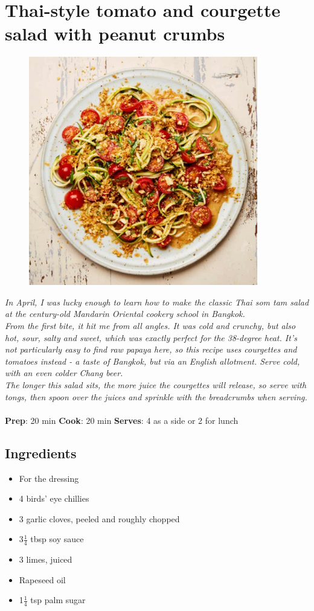 \documentclass{book}
\begin{document}
\section{Thai-style tomato and courgette salad with peanut crumbs}
\begin{figure}
\centering\includegraphics[width=10cm,height=10cm,keepaspectratio]{Recipe_Pictures/Thai-style_tomato_and_courgette_salad_with_peanut_crumbs.png}
\end{figure}
\emph{In April, I was lucky enough to learn how to make the classic Thai som tam salad at the century-old Mandarin Oriental cookery school in Bangkok. \\ 
From the first bite, it hit me from all angles. It was cold and crunchy, but also hot, sour, salty and sweet, which was exactly perfect for the 38-degree heat. It’s not particularly easy to find raw papaya here, so this recipe uses courgettes and tomatoes instead - a taste of Bangkok, but via an English allotment. Serve cold, with an even colder Chang beer.\\ 
The longer this salad sits, the more juice the courgettes will release, so serve with tongs, then spoon over the juices and sprinkle with the breadcrumbs when serving.}\\\\ 
\textbf{Prep}: 20 min
\textbf{Cook}: 20 min
\textbf{Serves}: 4 as a side or 2 for lunch
\subsection*{Ingredients}
\begin{itemize}
\item For the dressing
\item 4 birds’ eye chillies
\item 3 garlic cloves, peeled and roughly chopped
\item 3$\frac{1}{4}$ tbsp soy sauce
\item 3 limes, juiced
\item Rapeseed oil
\item 1$\frac{1}{4}$ tsp palm sugar
\end{itemize}
\end{document}
